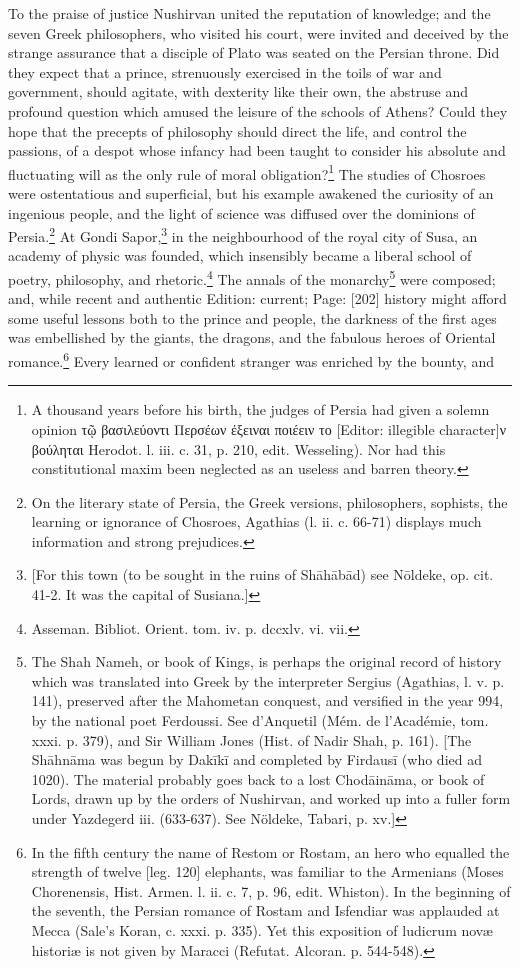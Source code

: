 To the praise of justice Nushirvan united the reputation of knowledge; and the seven Greek philosophers, who visited his court, were invited and deceived by the strange assurance that a disciple of Plato was seated on the Persian throne. Did they expect that a prince, strenuously exercised in the toils of war and government, should agitate, with dexterity like their own, the abstruse and profound question which amused the leisure of the schools of Athens? Could they hope that the precepts of philosophy should direct the life, and control the passions, of a despot whose infancy had been taught to consider his absolute and fluctuating will as the only rule of moral obligation?\footnote{A thousand years before his birth, the judges of Persia had given a solemn opinion \textgreek{τ\texthebrew{ῷ} βασιλεύοντι Περσέων \texthebrew{ἐ}ξειναι ποιέειν το} [Editor: illegible character]\textgreek{ν βούληται} Herodot. l. iii. c. 31, p. 210, edit. Wesseling). Nor had this constitutional maxim been neglected as an useless and barren theory.} The studies of Chosroes were ostentatious and superficial, but his example awakened the curiosity of an ingenious people, and the light of science was diffused over the dominions of Persia.\footnote{On the literary state of Persia, the Greek versions, philosophers, sophists, the learning or ignorance of Chosroes, Agathias (l. ii. c. 66-71) displays much information and strong prejudices.} At Gondi Sapor,\footnote{[For this town (to be sought in the ruins of Shāhābād) see Nōldeke, op. cit. 41-2. It was the capital of Susiana.]} in the neighbourhood of the royal city of Susa, an academy of physic was founded, which insensibly became a liberal school of poetry, philosophy, and rhetoric.\footnote{Asseman. Bibliot. Orient. tom. iv. p. dccxlv. vi. vii.} The annals of the monarchy\footnote{The Shah Nameh, or book of Kings, is perhaps the original record of history which was translated into Greek by the interpreter Sergius (Agathias, l. v. p. 141), preserved after the Mahometan conquest, and versified in the year 994, by the national poet Ferdoussi. See d\texthebrew{}’Anquetil (Mém. de l\texthebrew{}’Académie, tom. xxxi. p. 379), and Sir William Jones (Hist. of Nadir Shah, p. 161). [The Shāhnāma was begun by Dakīkī and completed by Firdausī (who died ad 1020). The material probably goes back to a lost Chodāināma, or book of Lords, drawn up by the orders of Nushirvan, and worked up into a fuller form under Yazdegerd iii. (633-637). See Nöldeke, Tabari, p. xv.]} were composed; and, while recent and authentic Edition: current; Page: [202] history might afford some useful lessons both to the prince and people, the darkness of the first ages was embellished by the giants, the dragons, and the fabulous heroes of Oriental romance.\footnote{In the fifth century the name of Restom or Rostam, an hero who equalled the strength of twelve [leg. 120] elephants, was familiar to the Armenians (Moses Chorenensis, Hist. Armen. l. ii. c. 7, p. 96, edit. Whiston). In the beginning of the seventh, the Persian romance of Rostam and Isfendiar was applauded at Mecca (Sale\texthebrew{}’s Koran, c. xxxi. p. 335). Yet this exposition of ludicrum novæ historiæ is not given by Maracci (Refutat. Alcoran. p. 544-548).} Every learned or confident stranger was enriched by the bounty, and 